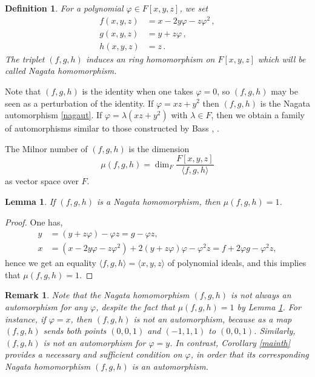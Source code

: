 \documentclass{amsart}
\newtheorem{lem}{Lemma}
\newtheorem{defn}{Definition}
\newtheorem{rmk}{Remark}
\begin{document}
\begin{defn}
	{\em 
		For a polynomial $\varphi\in F[x,y,z]$, we set
		\begin{equation}\label{eqnag}
			\begin{split}
				f(x,y,z)&=x-2y \varphi-z\varphi^2\,,\\
				g(x,y,z)&=y+z\varphi\,,\\
				h(x,y,z)&=z\,.     
			\end{split}
		\end{equation}
		The triplet $(f,g,h)$ induces an ring homomorphism on $F[x,y,z]$ which will be called {\em Nagata homomorphism}.	
	}
\end{defn}
Note that  $(f,g,h)$ is the identity when one takes $\varphi=0$, so $(f,g,h)$ may be seen as a perturbation of the identity. If $\varphi=xz+y^2$ then $(f,g,h)$ is the Nagata automorphism \eqref{nagaut}. If $\varphi=\lambda (xz+y^2)$ with $\lambda\in F$, then we obtain a family of automorphisms similar to those constructed by Bass \cite{Bass84}, \cite[3.8.1]{Freu17}. 


The Milnor number of $(f,g,h)$ is the dimension
$$\mu(f,g,h)=\dim_F \frac{F[x,y,z]}{\langle f,g,h\rangle}$$
as vector space over $F$. 
\begin{lem}\label{lemmilnor}
	If $(f,g,h)$ is a Nagata homomorphism, then $\mu(f,g,h)=1$.    
\end{lem}
\begin{proof}
	One has,
	\begin{align*}
		y&=(y+z \varphi)-     \varphi z=g-\varphi z,\\
		x&=(x-2y \varphi-z\varphi^2)+2(y+z \varphi)\varphi-\varphi^2 z=f+2\varphi g-\varphi^2 z,
	\end{align*}
	hence we get an equality $\langle f,g,h\rangle=\langle x,y,z\rangle$ of polynomial ideals, and this implies that $\mu(f,g,h)=1$.   
\end{proof}



\begin{rmk}
	{\em 
	Note that the Nagata homomorphism $(f,g,h)$ is not always an automorphism for any $\varphi$, despite the fact that $\mu(f,g,h)=1$ by Lemma \ref{lemmilnor}. For instance, if $\varphi=x$, then $(f,g,h)$ is not an automorphism, because as a map $(f,g,h)$ sends both points $(0,0,1)$ and $(-1,1,1)$ to $(0,0,1)$. Similarly, $(f,g,h)$ is not an automorphism for $\varphi=y$. In contrast, Corollary \ref{mainth} provides a necessary and sufficient condition on $\varphi$, in order that its corresponding Nagata homomorphism $(f,g,h)$ is an automorphism.
}	
\end{rmk}
\end{document}

